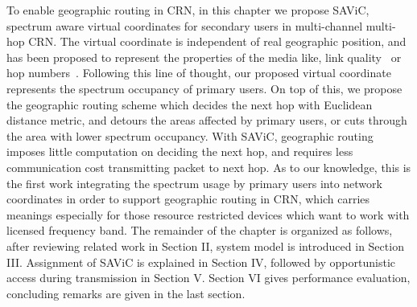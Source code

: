 To enable geographic routing in CRN, in this chapter we propose SAViC, spectrum aware virtual coordinates for secondary users in multi-channel multi-hop CRN.
The virtual coordinate is independent of real geographic position, and has been proposed to represent the properties of the media like, link quality~\cite{Alizai_11_probabilisticAddressing} or hop numbers~\cite{gpsfree05infocom}.
Following this line of thought, our proposed virtual coordinate represents the spectrum occupancy of primary users. 
On top of this, we propose the geographic routing scheme which decides the next hop with Euclidean distance metric, and detours the areas affected by primary users, or cuts through the area with lower spectrum occupancy.
With SAViC, geographic routing imposes little computation on deciding the next hop, and requires less communication cost transmitting packet to next hop.
As to our knowledge, this is the first work integrating the spectrum usage by primary users into network coordinates in order to support geographic routing in CRN, which carries meanings especially for those resource restricted devices which want to work with licensed frequency band.
The remainder of the chapter is organized as follows, after reviewing related work in Section II, system model is introduced in Section III.
Assignment of SAViC is explained in Section IV, followed by opportunistic access during transmission in Section V.
Section VI gives performance evaluation, concluding remarks are given in the last section.


